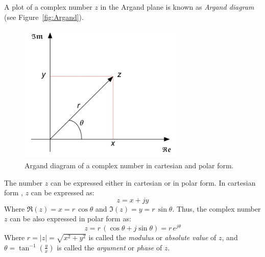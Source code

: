 A plot of a complex number $z$ in the Argand plane is known as \emph{Argand diagram} (see Figure~\ref{fig:Argand}).
\begin{figure}[h!]
  \centering
  \includegraphics[width=0.7\textwidth]{"images/Argand_diagram"}
  \caption{Argand diagram of a complex number in cartesian and polar form.} 
  \label{Fig:Argand}
\end{figure}
The number $z$ can be expressed either in cartesian or in polar form. In cartesian form , $z$ can be expressed as:
\[z = x + jy\]
Where $\Re(z) = x = r\,\cos\theta$ and $\Im(z) = y = r\,\sin\theta$. Thus, the complex number $z$ can be also expressed in polar form as:
\[z = r\,\left(\cos\theta + j\sin\theta\right)=r\,e^{j\theta}\]
Where $r = |z| = \sqrt{x^2 + y^2}$ is called the \emph{modulus} or \emph{absolute value} of $z$, and $\theta=\tan^{-1}\left(\frac{y}{x}\right)$ is called the \emph{argument} or \emph{phase} of $z$.

